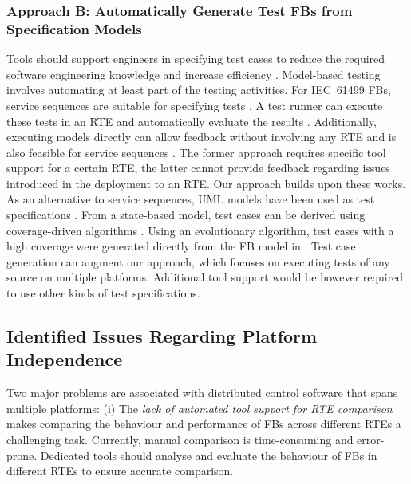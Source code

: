 \documentclass[conference]{IEEEtran}
\begin{document}
\subsubsection{Approach B: Automatically Generate Test FBs from Specification Models}
Tools should support engineers in specifying test cases to reduce the required software engineering knowledge and increase efficiency \cite{hametner2014}. Model-based testing involves automating at least part of the testing activities. For IEC~61499 FBs, service sequences are suitable for specifying tests \cite{hametner2014}. 
A test runner can execute these tests in an RTE and automatically evaluate the results \cite{hametner2014}. Additionally, executing models directly can allow feedback without involving any RTE and is also feasible for service sequences \cite{wiesmayr2021}. The former approach requires specific tool support for a certain RTE, the latter cannot provide feedback regarding issues introduced in the deployment to an RTE. Our approach builds upon these works. 
As an alternative to service sequences, UML models have been used as test specifications \cite{Hussain.2006}. From a state-based model, test cases can be derived using coverage-driven algorithms \cite{Hussain.2006}. Using an evolutionary algorithm, test cases with a high coverage were generated directly from the FB model in \cite{Buzhinsky.2015}. Test case generation can augment our approach, which focuses on executing tests of any source on multiple platforms. Additional tool support would be however required to use other kinds of test specifications.


\subsection{Identified Issues Regarding Platform Independence}
Two major problems are associated with distributed control software that spans multiple platforms: 
(i) The \emph{lack of automated tool support for RTE comparison} makes comparing the behaviour and performance of FBs across different RTEs a challenging task. Currently, manual comparison is time-consuming and error-prone. Dedicated tools should analyse and evaluate the behaviour of FBs in different RTEs to ensure accurate comparison.
\end{document}
